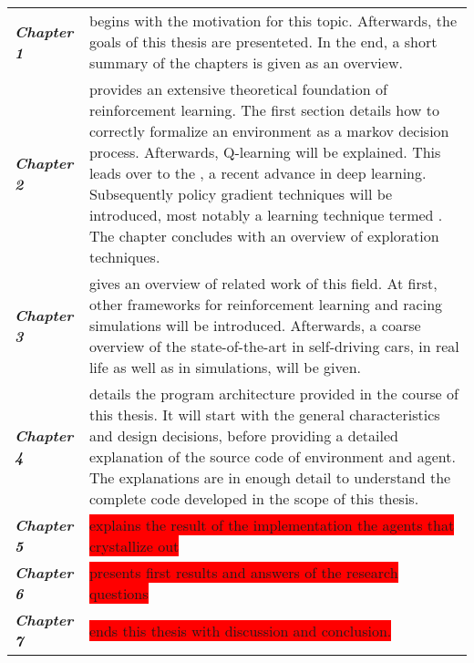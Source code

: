 \renewcommand{\arraystretch}{1.3}
\begin{flushleft}
\begin{tabular}{>{\em}p{2.4cm} p{\textwidth-3.8cm}} 
	\textbf{Chapter 1} & begins with the motivation for this topic. Afterwards, the goals of this thesis are presenteted. In the end, a short summary of the chapters is given as an overview.\\
	\textbf{Chapter 2} & provides an extensive theoretical foundation of reinforcement learning. The first section details how to correctly formalize an environment as a markov decision process. Afterwards, Q-learning will be explained. This leads over to the \keyword{Deep Q Network}, a recent advance in deep learning. Subsequently policy gradient techniques will be introduced, most notably a learning technique termed \keyword{Deep DPG}. The chapter concludes with an overview of exploration techniques.\\
	\textbf{Chapter 3} & gives an overview of related work of this field. At first, other frameworks for reinforcement learning and racing simulations will be introduced. Afterwards, a coarse overview of the state-of-the-art in self-driving cars, in real life as well as in simulations, will be given.\\
	\textbf{Chapter 4} & details the program architecture provided in the course of this thesis. It will start with the general characteristics and design decisions, before providing a detailed explanation of the source code of environment and agent. The explanations are in enough detail to understand the complete code developed in the scope of this thesis.\\
	\textbf{Chapter 5} & \colorbox{red}{explains the result of the implementation the agents that crystallize out}\\
	\textbf{Chapter 6} & \colorbox{red}{presents first results and answers of the research questions}\\
	\textbf{Chapter 7} & \colorbox{red}{ends this thesis with discussion and conclusion.}
\end{tabular}
\end{flushleft}